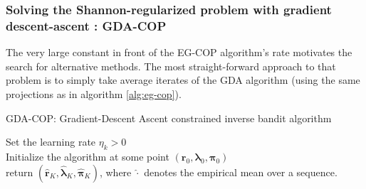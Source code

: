 \subsubsection{Solving the Shannon-regularized problem with gradient descent-ascent : GDA-COP}

The very large constant in front of the EG-COP algorithm's rate motivates the search for alternative methods. The most straight-forward approach to that problem is to simply take average iterates of the GDA algorithm (using the same projections as in algorithm \ref{alg:eg-cop}). 

\begin{algorithm}
    \SetAlgoLined
  \small
    \caption{GDA-COP: Gradient-Descent Ascent constrained inverse bandit algorithm}
    \label{alg:gda-cop}
      Set the learning rate $\eta_k >0$ \\
      Initialize the algorithm at some point $(\bm{r}_0,\bm{\lambda}_0,\bm{\pi}_0)$  \\
      return $(\hat{\bm{r}}_K,\hat{\bm{\lambda}}_K,\hat{\bm{\pi}}_K)$, where $\hat{\cdot}$ denotes the empirical mean over a sequence.
  \end{algorithm}


